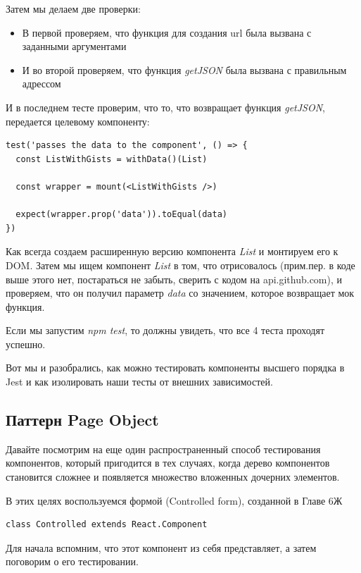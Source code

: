 Затем мы делаем две проверки:

\begin{itemize}
  \item В первой проверяем, что функция для создания url была вызвана с заданными аргументами
  \item И во второй проверяем, что функция \textit{getJSON} была вызвана с правильным адрессом
\end{itemize}

И в последнем тесте проверим, что то, что возвращает функция \textit{getJSON}, передается целевому компоненту:

\begin{lstlisting}
test('passes the data to the component', () => {
  const ListWithGists = withData()(List)
  
  const wrapper = mount(<ListWithGists />)
  
  expect(wrapper.prop('data')).toEqual(data)
})
\end{lstlisting}

Как всегда создаем расширенную версию компонента \textit{List} и монтируем его к DOM. Затем мы ищем компонент \textit{List} в том, что отрисовалось (прим.пер. в коде выше этого нет, постараться не забыть, сверить с кодом на api.github.com), и проверяем, что он получил параметр \textit{data} со значением, которое возвращает мок функция.

Если мы запустим \textit{npm test}, то должны увидеть, что все 4 теста проходят успешно.

Вот мы и разобрались, как можно тестировать компоненты высшего порядка в Jest и как изолировать наши тесты от внешних зависимостей.

\subsection{Паттерн Page Object}

Давайте посмотрим на еще один распространенный способ тестирования компонентов, который пригодится в тех случаях, когда дерево компонентов становится сложнее и появляется множество вложенных дочерних элементов.

В этих целях воспользуемся формой (Controlled form), созданной в Главе 6Ж

\begin{lstlisting}
class Controlled extends React.Component
\end{lstlisting}

Для начала вспомним, что этот компонент из себя представляет, а затем поговорим о его тестировании.

